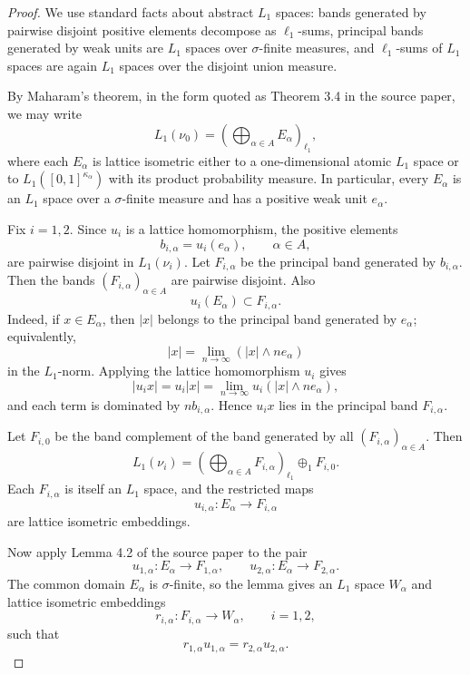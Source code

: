 \documentclass[11pt]{article}
\newcommand{\Lone}{L_1}
\begin{document}
\begin{proof}
We use standard facts about abstract \(L_1\) spaces: bands generated by
pairwise disjoint positive elements decompose as \(\ell_1\)-sums, principal
bands generated by weak units are \(L_1\) spaces over \(\sigma\)-finite
measures, and \(\ell_1\)-sums of \(L_1\) spaces are again \(L_1\) spaces over
the disjoint union measure.

By Maharam's theorem, in the form quoted as Theorem 3.4 in the source paper,
we may write
\[
  \Lone(\nu_0)=\left(\bigoplus_{\alpha\in A} E_\alpha\right)_{\ell_1},
\]
where each \(E_\alpha\) is lattice isometric either to a one-dimensional
atomic \(L_1\) space or to \(L_1([0,1]^{\kappa_\alpha})\) with its product
probability measure.  In particular, every \(E_\alpha\) is an \(L_1\) space
over a \(\sigma\)-finite measure and has a positive weak unit \(e_\alpha\).

Fix \(i=1,2\).  Since \(u_i\) is a lattice homomorphism, the positive elements
\[
  b_{i,\alpha}=u_i(e_\alpha),\qquad \alpha\in A,
\]
are pairwise disjoint in \(\Lone(\nu_i)\).  Let \(F_{i,\alpha}\) be the
principal band generated by \(b_{i,\alpha}\).  Then the bands
\((F_{i,\alpha})_{\alpha\in A}\) are pairwise disjoint.  Also
\[
  u_i(E_\alpha)\subset F_{i,\alpha}.
\]
Indeed, if \(x\in E_\alpha\), then \(|x|\) belongs to the principal band
generated by \(e_\alpha\); equivalently,
\[
  |x|=\lim_{n\to\infty}(|x|\wedge n e_\alpha)
\]
in the \(L_1\)-norm.  Applying the lattice homomorphism \(u_i\) gives
\[
  |u_i x|
  =u_i|x|
  =\lim_{n\to\infty}u_i(|x|\wedge n e_\alpha),
\]
and each term is dominated by \(n b_{i,\alpha}\).  Hence \(u_i x\) lies in the
principal band \(F_{i,\alpha}\).

Let \(F_{i,0}\) be the band complement of the band generated by all
\((F_{i,\alpha})_{\alpha\in A}\).  Then
\[
  \Lone(\nu_i)=
  \left(\bigoplus_{\alpha\in A}F_{i,\alpha}\right)_{\ell_1}
  \oplus_1 F_{i,0}.
\]
Each \(F_{i,\alpha}\) is itself an \(L_1\) space, and the restricted maps
\[
  u_{i,\alpha}:E_\alpha\longrightarrow F_{i,\alpha}
\]
are lattice isometric embeddings.

Now apply Lemma 4.2 of the source paper to the pair
\[
  u_{1,\alpha}:E_\alpha\to F_{1,\alpha},\qquad
  u_{2,\alpha}:E_\alpha\to F_{2,\alpha}.
\]
The common domain \(E_\alpha\) is \(\sigma\)-finite, so the lemma gives an
\(L_1\) space \(W_\alpha\) and lattice isometric embeddings
\[
  r_{i,\alpha}:F_{i,\alpha}\longrightarrow W_\alpha,\qquad i=1,2,
\]
such that
\[
  r_{1,\alpha}u_{1,\alpha}=r_{2,\alpha}u_{2,\alpha}.
\]


\end{proof}
\end{document}
